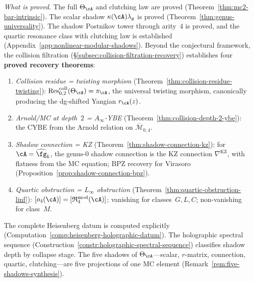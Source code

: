 \noindent\emph{What is proved.}
The full $\Theta_\cA$ and clutching law are proved
(Theorem~\ref{thm:mc2-bar-intrinsic}).  The scalar shadow
$\kappa(\cA)\lambda_g$ is proved (Theorem~\ref{thm:genus-universality}).
The shadow Postnikov tower through arity~$4$ is proved, and the
quartic resonance class with clutching law is established
(Appendix~\ref{app:nonlinear-modular-shadows}).
Beyond the conjectural framework, the collision filtration
(\S\ref{subsec:collision-filtration-recovery}) establishes four
\textbf{proved recovery theorems}:
\begin{enumerate}[label=\textup{(\alph*)}]
\item \emph{Collision residue = twisting morphism}
  (Theorem~\ref{thm:collision-residue-twisting}):
  $\operatorname{Res}^{\mathrm{coll}}_{0,2}(\Theta_\cA) =
  \pi_\cA$, the universal twisting morphism, canonically producing
  the dg-shifted Yangian $r_\cA(z)$.
\item \emph{Arnold/MC at depth~$2$ = $A_\infty$-YBE}
  (Theorem~\ref{thm:collision-depth-2-ybe}): the CYBE from the
  Arnold relation on $\overline{\mathcal{M}}_{0,4}$.
\item \emph{Shadow connection = KZ}
  (Theorem~\ref{thm:shadow-connection-kz}): for
  $\cA = \widehat{\fg}_k$, the genus-$0$ shadow connection is
  the KZ connection $\nabla^{\mathrm{KZ}}$, with flatness
  from the MC equation; BPZ recovery for Virasoro
  (Proposition~\ref{prop:shadow-connection-bpz}).
\item \emph{Quartic obstruction = $L_\infty$ obstruction}
  (Theorem~\ref{thm:quartic-obstruction-linf}):
  $[o_4(\cA)] = [\mathfrak{R}^{\mathrm{mod}}_4(\cA)]$;
  vanishing for classes~$G,L,C$; non-vanishing for class~$M$.
\end{enumerate}
The complete Heisenberg datum is computed explicitly
(Computation~\ref{comp:heisenberg-holographic-datum}).
The holographic spectral sequence
(Construction~\ref{constr:holographic-spectral-sequence})
classifies shadow depth by collapse stage.
The five shadows of $\Theta_\cA$---scalar, $r$-matrix, connection,
quartic, clutching---are five projections of one MC element
(Remark~\ref{rem:five-shadows-synthesis}).

